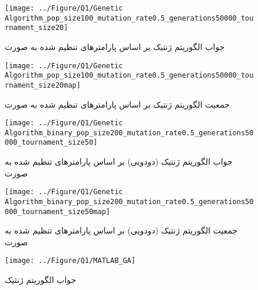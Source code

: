 \begin{figure}[H]
	\caption{جواب الگوریتم ژنتیک بر اساس پارامترهای تنظیم شده به صورت } 
	\centering 
	\texttt{[image: ../Figure/Q1/Genetic Algorithm\_pop\_size100\_mutation\_rate0.5\_generations50000\_tournament\_size20]} 
\end{figure}

\begin{figure}[H]
	\caption{جمعیت الگوریتم ژنتیک بر اساس پارامترهای تنظیم شده به صورت } 
	\centering 
	\texttt{[image: ../Figure/Q1/Genetic Algorithm\_pop\_size100\_mutation\_rate0.5\_generations50000\_tournament\_size20map]} 
\end{figure}


\begin{figure}[H]
	\caption{جواب الگوریتم ژنتیک (دودویی) بر اساس پارامترهای تنظیم شده به صورت } 
	\centering 
	\texttt{[image: ../Figure/Q1/Genetic Algorithm\_binary\_pop\_size200\_mutation\_rate0.5\_generations50000\_tournament\_size50]} 
\end{figure}

\begin{figure}[H]
	\caption{جمعیت الگوریتم ژنتیک (دودویی) بر اساس پارامترهای تنظیم شده به صورت } 
	\centering 
	\texttt{[image: ../Figure/Q1/Genetic Algorithm\_binary\_pop\_size200\_mutation\_rate0.5\_generations50000\_tournament\_size50map]} 
\end{figure}


\begin{figure}[H]
	\caption{جواب الگوریتم ژنتیک } 
	\centering 
	\texttt{[image: ../Figure/Q1/MATLAB\_GA]}
\end{figure}